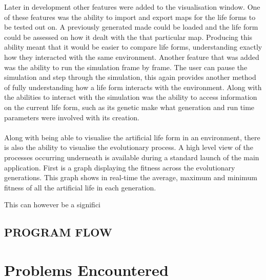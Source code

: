 \documentclass[12pt]{article}
\begin{document}
Later in development other features were added to the visualisation window. One of these features was the ability to import and export maps for the life forms to be
tested out on. A previously generated made could be loaded and the life form could be assessed on how it dealt with the that particular map. Producing this ability meant that it would be easier to compare life forms, understanding exactly how they interacted with the same environment.
Another feature that was added was the ability to run the simulation frame by frame. The user can pause the simulation and step through the simulation, this again provides another method of fully understanding how a life form interacts with the environment. 
Along with the abilities to interact with the simulation was the ability to access information on the current life form, such as its genetic make what generation
and run time parameters were involved with its creation.

\paragraph{}
Along with being able to visualise the artificial life form in an environment, there is also the ability to visualise the
evolutionary process. A high level view of the processes occurring underneath is available during a standard launch of the
main application. First is a graph displaying the fitness across the evolutionary generations. This graph shows in real-time the
average, maximum and minimum fitness of all the artificial life in each generation.

This can however be a significi

\subsection{PROGRAM FLOW}

\section{Problems Encountered}
\end{document}
